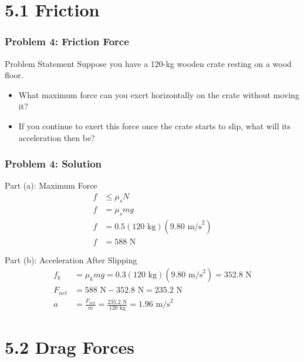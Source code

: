 \documentclass{beamer}
\begin{document}
\section{5.1 Friction}

\begin{frame}
\frametitle{Problem 4: Friction Force}
\begin{block}{Problem Statement}
Suppose you have a 120-kg wooden crate resting on a wood floor.
\begin{itemize}
    \item[(a)] What maximum force can you exert horizontally on the crate without moving it?
    \item[(b)] If you continue to exert this force once the crate starts to slip, what will its acceleration then be?
\end{itemize}
\end{block}
\end{frame}

\begin{frame}
\frametitle{Problem 4: Solution}
\begin{block}{Part (a): Maximum Force}
\begin{align*}
f &\leq \mu_sN \\
f &= \mu_smg \\
f &= 0.5(120 \text{ kg})(9.80 \text{ m/s}^2) \\
f &= 588 \text{ N}
\end{align*}
\end{block}

\begin{block}{Part (b): Acceleration After Slipping}
\begin{align*}
f_k &= \mu_kmg = 0.3(120 \text{ kg})(9.80 \text{ m/s}^2) = 352.8 \text{ N} \\
F_{net} &= 588 \text{ N} - 352.8 \text{ N} = 235.2 \text{ N} \\
a &= \frac{F_{net}}{m} = \frac{235.2 \text{ N}}{120 \text{ kg}} = 1.96 \text{ m/s}^2
\end{align*}
\end{block}
\end{frame}

\section{5.2 Drag Forces}
\end{document}
